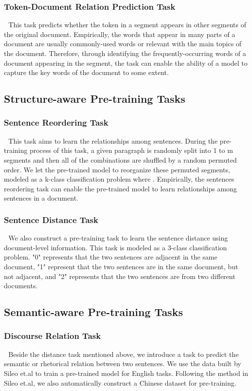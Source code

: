 \documentclass[letterpaper]{article} \usepackage{aaai20}  \usepackage{times}  \usepackage{helvet} \usepackage{courier}  \usepackage[hyphens]{url}  \usepackage{graphicx} \usepackage{makecell}
\begin{document}
\subsubsection{Token-Document Relation Prediction Task}  \,\,
This task predicts whether the token in a segment appears in other segments of the original document. Empirically, the words that appear in many parts of a document are usually commonly-used words or relevant with the main topics of the document. Therefore, through identifying the frequently-occurring words of a document appearing in the segment, the task can enable the ability of a model to capture the key words of the document to some extent.

\subsection{Structure-aware Pre-training Tasks}

\subsubsection{Sentence Reordering Task} \,\, 
This task aims to learn the relationships among sentences. During the pre-training process of this task, a given paragraph is randomly split into 1 to m segments and then all of the combinations are shuffled by a random permuted order. We let the pre-trained model to reorganize these permuted segments, modeled as a k-class classification problem where . Empirically, the sentences reordering task can enable the pre-trained model to learn relationships among sentences in a document.


\subsubsection{Sentence Distance Task} \,\, 
We also construct a pre-training task to learn the sentence distance using document-level information. This task is modeled as a 3-class classification problem. "0" represents that the two sentences are adjacent in the same document, "1" represent that the two sentences are in the same document, but not adjacent, and "2" represents that the two sentences are from two different documents.

\subsection{Semantic-aware Pre-training Tasks}


\subsubsection{Discourse Relation Task} \,\, 
Beside the distance task mentioned above, we introduce a task to predict the semantic or rhetorical relation between two sentences. We use the data built by Sileo et.al\cite{sileo2019mining} to train a pre-trained model for English tasks. Following the method in Sileo et.al\cite{sileo2019mining}, we also automatically construct a Chinese dataset for pre-training.
\end{document}
